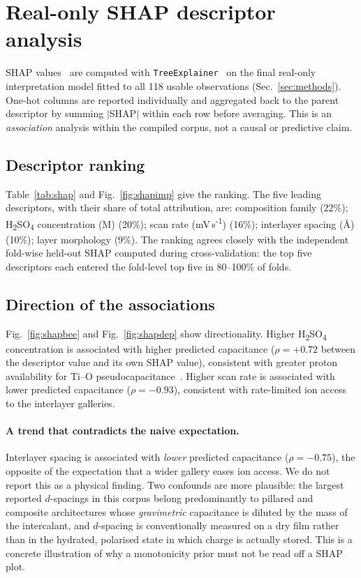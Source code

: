 \section{Real-only SHAP descriptor analysis}\label{sec:shap}

SHAP values~\cite{shap2017} are computed with \texttt{TreeExplainer}~\cite{treeshap2020}
on the final real-only interpretation model fitted to all 118 usable observations (Sec.~\ref{sec:methods}). One-hot columns are
reported individually and aggregated back to the parent descriptor by summing $|$SHAP$|$
within each row before averaging. This is an \emph{association} analysis within the compiled
corpus, not a causal or predictive claim.

\subsection{Descriptor ranking}
Table~\ref{tab:shap} and Fig.~\ref{fig:shapimp} give the ranking. The five leading
descriptors, with their share of total attribution, are: composition family (22\%); H\textsubscript{2}SO\textsubscript{4} concentration (M) (20\%); scan rate (mV\,s\textsuperscript{-1}) (16\%); interlayer spacing (\AA) (10\%); layer morphology (9\%). The ranking agrees closely with
the independent fold-wise held-out SHAP computed during cross-validation: the top five
descriptors each entered the fold-level top five in
80--100\%
of folds.

\subsection{Direction of the associations}
Fig.~\ref{fig:shapbee} and Fig.~\ref{fig:shapdep} show directionality. Higher
H\textsubscript{2}SO\textsubscript{4} concentration is associated with higher predicted
capacitance ($\rho = +0.72$ between the
descriptor value and its own SHAP value), consistent with greater proton availability for
Ti--O pseudocapacitance~\cite{lukatskaya2017}. Higher scan rate is associated with lower predicted capacitance
($\rho = -0.93$), consistent with
rate-limited ion access to the interlayer galleries.

\paragraph{A trend that contradicts the naive expectation.} Interlayer spacing is associated
with \emph{lower} predicted capacitance
($\rho = -0.75$), the opposite of the expectation that a wider gallery eases ion
access. We do not report this as a physical finding. Two confounds are more plausible: the
largest reported $d$-spacings in this corpus belong predominantly to pillared and composite
architectures whose \emph{gravimetric} capacitance is diluted by the mass of the
intercalant, and $d$-spacing is conventionally measured on a dry film rather than in the
hydrated, polarised state in which charge is actually stored. This is a concrete illustration
of why a monotonicity prior must not be read off a SHAP plot.

